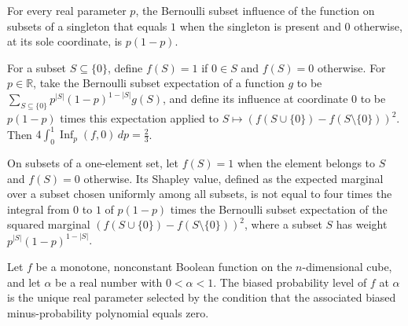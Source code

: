 \begin{theorem}
\label{FABL.bernoulliSubsetInfluence_shapleyDictator}
\leanok
{}
For every real parameter $p$, the Bernoulli subset influence of the function on subsets
of a singleton that equals $1$ when the singleton is present and $0$ otherwise, at its
sole coordinate, is $p(1-p)$.
\end{theorem}

\begin{theorem}
\label{FABL.four_mul_integral_influence_shapleyDictator}
\leanok
{}
For a subset $S\subseteq\{0\}$, define $f(S)=1$ if $0\in S$ and $f(S)=0$ otherwise. For
$p\in\mathbb R$, take the Bernoulli subset expectation of a function $g$ to be
$\sum_{S\subseteq\{0\}}p^{|S|}(1-p)^{1-|S|}g(S)$, and define its influence at coordinate
$0$ to be $p(1-p)$ times this expectation applied to
$S\mapsto(f(S\cup\{0\})-f(S\setminus\{0\}))^2$. Then $4\int_0^1
\operatorname{Inf}_p(f,0)\,dp=\frac23$.
\end{theorem}

\begin{theorem}
\label{FABL.printed_shapley_four_integral_formula_false}
\leanok
{}
On subsets of a one-element set, let $f(S)=1$ when the element belongs to $S$ and
$f(S)=0$ otherwise. Its Shapley value, defined as the expected marginal over a subset
chosen uniformly among all subsets, is not equal to four times the integral from $0$ to
$1$ of $p(1-p)$ times the Bernoulli subset expectation of the squared marginal
$(f(S\cup\{0\})-f(S\setminus\{0\}))^2$, where a subset $S$ has weight
$p^{|S|}(1-p)^{1-|S|}$.
\end{theorem}

\begin{definition}
\label{FABL.biasedProbabilityLevel}
\leanok
{}
Let $f$ be a monotone, nonconstant Boolean function on the $n$-dimensional cube, and let
$\alpha$ be a real number with $0<\alpha<1$. The biased probability level of $f$ at
$\alpha$ is the unique real parameter selected by the condition that the associated
biased minus-probability polynomial equals zero.
\end{definition}

